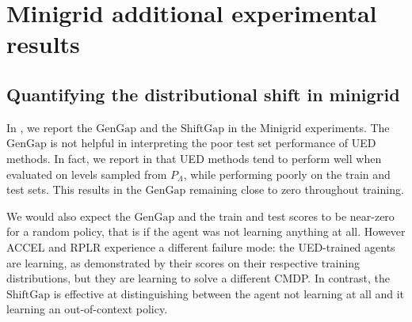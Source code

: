 
\section{Minigrid additional experimental results}\label{c3:app:results_minigrid}

\subsection{Quantifying the distributional shift in minigrid}\label{c3:app:dist-shift}

In , we report the $\text{GenGap}$ and the $\text{ShiftGap}$ in the Minigrid experiments. The $\text{GenGap}$ is not helpful in interpreting the poor test set performance of UED methods. In fact, we report in  that UED methods tend to perform well when evaluated on levels sampled from $P_\Lambda$, while performing poorly on the train and test sets. This results in the $\text{GenGap}$ remaining close to zero throughout training. 

We would also expect the $\text{GenGap}$ and the train and test scores to be near-zero for a random policy, that is if the agent was not learning anything at all. However ACCEL and RPLR experience a different failure mode: the UED-trained agents are learning, as demonstrated by their scores on their respective training distributions, but they are learning to solve a different CMDP. In contrast, the $\text{ShiftGap}$ is effective at distinguishing between the agent not learning at all and it learning an out-of-context policy.

